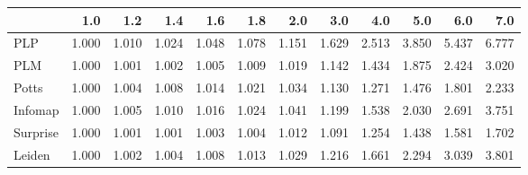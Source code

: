 \begin{tabular}{lrrrrrrrrrrr}
\toprule
{} &   1.0 &   1.2 &   1.4 &   1.6 &   1.8 &   2.0 &   3.0 &   4.0 &   5.0 &   6.0 &   7.0 \\
\midrule
PLP      & 1.000 & 1.010 & 1.024 & 1.048 & 1.078 & 1.151 & 1.629 & 2.513 & 3.850 & 5.437 & 6.777 \\
PLM      & 1.000 & 1.001 & 1.002 & 1.005 & 1.009 & 1.019 & 1.142 & 1.434 & 1.875 & 2.424 & 3.020 \\
Potts    & 1.000 & 1.004 & 1.008 & 1.014 & 1.021 & 1.034 & 1.130 & 1.271 & 1.476 & 1.801 & 2.233 \\
Infomap  & 1.000 & 1.005 & 1.010 & 1.016 & 1.024 & 1.041 & 1.199 & 1.538 & 2.030 & 2.691 & 3.751 \\
Surprise & 1.000 & 1.001 & 1.001 & 1.003 & 1.004 & 1.012 & 1.091 & 1.254 & 1.438 & 1.581 & 1.702 \\
Leiden   & 1.000 & 1.002 & 1.004 & 1.008 & 1.013 & 1.029 & 1.216 & 1.661 & 2.294 & 3.039 & 3.801 \\
\bottomrule
\end{tabular}
